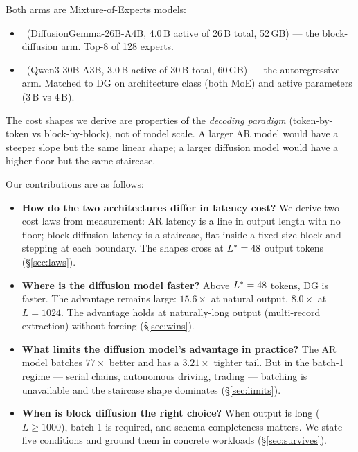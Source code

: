 Both arms are Mixture-of-Experts models:
\begin{itemize}[nosep]
\item \DG\ (DiffusionGemma-26B-A4B, 4.0\,B active of 26\,B total,
  52\,GB) --- the block-diffusion arm. Top-8 of 128 experts.
\item \ARthree\ (Qwen3-30B-A3B, 3.0\,B active of 30\,B total,
  60\,GB) --- the autoregressive arm. Matched to DG on architecture
  class (both MoE) and active parameters (3\,B vs 4\,B).
\end{itemize}
The cost shapes we derive are properties of the \emph{decoding
paradigm} (token-by-token vs block-by-block), not of model scale. A
larger AR model would have a steeper slope but the same linear shape;
a larger diffusion model would have a higher floor but the same
staircase.

Our contributions are as follows:
\begin{itemize}[leftmargin=1.5em]
\item \textbf{How do the two architectures differ in latency cost?}
We derive two cost laws from measurement: AR latency is a line in output
length with no floor; block-diffusion latency is a staircase, flat inside
a fixed-size block and stepping at each boundary. The shapes cross at
$L^{*} = 48$ output tokens (\S\ref{sec:laws}).

\item \textbf{Where is the diffusion model faster?}
Above $L^{*} = 48$ tokens, DG is faster. The advantage remains
large: $15.6\times$ at natural output, $8.0\times$ at
$L{=}1024$. The advantage holds at naturally-long output (multi-record
extraction) without forcing (\S\ref{sec:wins}).

\item \textbf{What limits the diffusion model's advantage in practice?}
The AR model batches $77\times$ better and has a $3.21\times$ tighter
tail. But in the batch-1 regime --- serial chains, autonomous driving,
trading --- batching is unavailable and the staircase shape dominates
(\S\ref{sec:limits}).

\item \textbf{When is block diffusion the right choice?}
When output is long ($L \geq 1000$), batch-1 is required, and schema
completeness matters. We state five conditions and ground them in
concrete workloads (\S\ref{sec:survives}).
\end{itemize}

